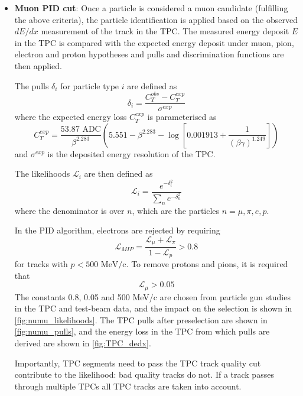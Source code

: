\begin{itemize}
	\item \textbf{Muon PID cut}: Once a particle is considered a muon candidate (fulfilling the above criteria), the particle identification is applied based on the observed $dE/dx$ measurement of the track in the TPC. The measured energy deposit $E$ in the TPC is compared with the expected energy deposit under muon, pion, electron and proton hypotheses and pulls and discrimination functions are then applied.
	
	The pulls $\delta_i$ for particle type $i$ are defined as
	\begin{equation}
	\label{eq:tpc_track_chi2}
	\delta_i = \frac{C_T^{obs}-C_T^{exp}}{\sigma^{exp}}
	\end{equation}
	where the expected energy loss $C_T^{exp}$ is parameterised as
	\begin{equation}
	C_T^{exp} = \frac{53.87 \text{ ADC}}{\beta^{2.283}} \left( 5.551 - \beta^{2.283} - \log\left[0.001913 + \frac{1}{\left(\beta\gamma\right)^{1.249}}\right]\right)
	\end{equation}
	and $\sigma^{exp}$ is the deposited energy resolution of the TPC.
	
	The likelihoods $\mathcal{L}_i$ are then defined as
	\begin{equation}
	\label{eq:tpc_track_likelihood}
		\mathcal{L}_i = \frac{e^{-\delta^2_i}}{\sum_n e^{-\delta^2_n}}
	\end{equation}
	where the denominator is over $n$, which are the particles $n=\mu,\pi,e,p$. 
	
	In the PID algorithm, electrons are rejected by requiring
	\begin{equation}
		\label{eq:tpc_track_mip}
		\mathcal{L}_{MIP} = \frac{\mathcal{L}_\mu + \mathcal{L}_\pi}{1-\mathcal{L}_p} > 0.8
	\end{equation}
	for tracks with $p<500\text{ MeV/c}$. To remove protons and pions, it is required that
	\begin{equation}
	\label{eq:tpc_track_mu}
		\mathcal{L}_\mu > 0.05
	\end{equation}
	The constants 0.8, 0.05 and 500 MeV/c are chosen from particle gun studies in the TPC and test-beam data, and the impact on the selection is shown in \autoref{fig:numu_likelihoods}. The TPC pulls after preselection are shown in \autoref{fig:numu_pulls}, and the energy loss in the TPC from which pulls are derived are shown in \autoref{fig:TPC_dedx}.
	
	Importantly, TPC segments need to pass the TPC track quality cut contribute to the likelihood: bad quality tracks do not. If a track passes through multiple TPCs all TPC tracks are taken into account.
\end{itemize}

